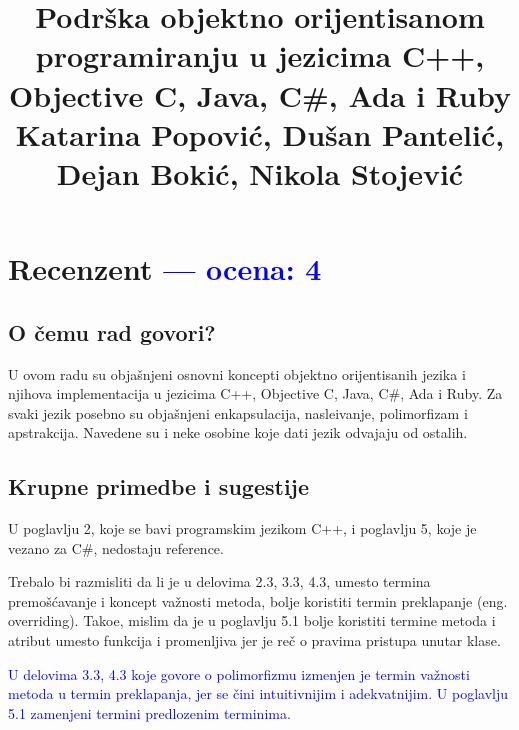 \documentclass[a4paper]{report}
\newcommand{\odgovor}[1]{\textcolor{blue}{#1}}
\begin{document}
\title{ Podrška objektno orijentisanom programiranju u jezicima C++, Objective C, Java, C\#, Ada i Ruby\\ \small{Katarina Popović, Dušan Pantelić, Dejan Bokić, Nikola Stojević}}

\maketitle

\tableofcontents

\chapter{Recenzent \odgovor{--- ocena: 4} }


\section{O čemu rad govori?}
U ovom radu su obja\v snjeni osnovni koncepti objektno orijentisanih jezika i njihova implementacija u jezicima C++, Objective C, Java, C\#, Ada i Ruby.
Za svaki jezik posebno su obja\v snjeni enkapsulacija, nasle\dj{}ivanje, polimorfizam i apstrakcija. Navedene su i neke osobine koje dati jezik odvajaju od ostalih.
\section{Krupne primedbe i sugestije}
U poglavlju 2, koje se bavi programskim jezikom C++, i poglavlju 5, koje je vezano za C\#, nedostaju reference. 

Trebalo bi razmisliti da li je u delovima 2.3, 3.3, 4.3,  umesto termina premo\v s\'cavanje i koncept va\v znosti metoda, bolje koristiti termin preklapanje (eng. overriding). Tako\dj{}e, mislim da je u poglavlju 5.1 bolje koristiti termine metoda i atribut  umesto funkcija i promenljiva jer je re\v c o pravima pristupa unutar klase.

\odgovor{
U delovima 3.3, 4.3 koje govore o polimorfizmu izmenjen je termin važnosti metoda u termin preklapanja, jer se čini intuitivnijim i adekvatnijim. U poglavlju 5.1 zamenjeni termini predlozenim terminima.}
\end{document}
